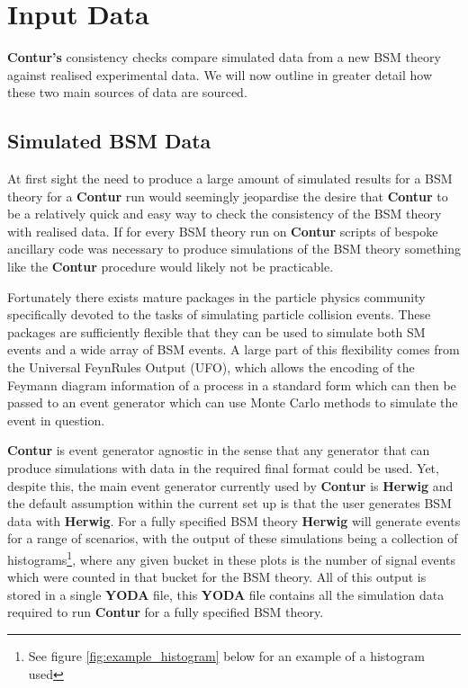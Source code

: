 \section{Input Data}\label{data}

\textbf{Contur's} consistency checks compare simulated data from a new BSM theory against realised experimental data. We will now outline in greater detail how these two main sources of data are sourced.

\subsection{Simulated BSM Data}

At first sight the need to produce a large amount of simulated results for a BSM theory for a \textbf{Contur} run would seemingly jeopardise the desire that \textbf{Contur} to be a relatively quick and easy way to check the consistency of the BSM theory with realised data. If for every BSM theory run on \textbf{Contur} scripts of bespoke ancillary code was necessary to produce simulations of the BSM theory something like the \textbf{Contur} procedure would likely not be practicable. 

Fortunately there exists mature packages in the particle physics community specifically devoted to the tasks of simulating particle collision events. These packages are sufficiently flexible that they can be used to simulate both SM events and a wide array of BSM events. A large part of this flexibility comes from the Universal FeynRules Output (UFO)\cite{ufo}, which allows the encoding of the Feymann diagram information of a process in a standard form which can then be passed to an event generator which can use Monte Carlo methods to simulate the event in question.

\textbf{Contur} is event generator agnostic in the sense that any generator that can produce simulations with data in the required final format could be used. Yet, despite this, the main event generator currently used by \textbf{Contur} is \textbf{Herwig}\cite{herwig} and the default assumption within the current set up is that the user generates BSM data with \textbf{Herwig}. For a fully specified BSM theory \textbf{Herwig} will generate events for a range of scenarios, with the output of these simulations being a collection of histograms\footnote{See figure \ref{fig:example_histogram} below for an example of a histogram used}, where any given bucket in these plots is the number of signal events which were counted in that bucket for the BSM theory. All of this output is stored in a single \textbf{YODA} file\cite{yoda}, this \textbf{YODA} file contains all the simulation data required to run \textbf{Contur} for a fully specified BSM theory.

